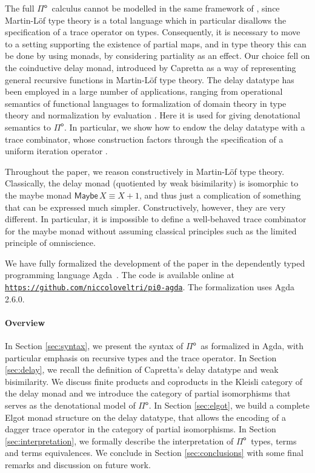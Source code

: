 \documentclass[runningheads,a4paper]{llncs}
\newcommand{\Pio}{\ensuremath{\mathsf{\Pi}^{\mathsf{o}}}}
\newcommand{\Maybe}{\mathsf{Maybe}}
\begin{document}
The full \Pio\ calculus cannot be modelled in the same framework of
\cite{CaretteS16}, since Martin-L\"of type theory is a total language
which in particular disallows the specification of a trace
operator on types. Consequently, it is necessary to move to a setting
supporting the existence of partial maps, and in type theory this can
be done by using monads, by considering partiality as an effect. Our
choice fell on the coinductive delay monad, introduced by Capretta
\cite{Capretta05} as a way of representing general recursive functions
in Martin-L\"of type theory. The delay datatype has been employed in a
large number of applications, ranging from operational semantics of
functional languages \cite{Danielsson12} to formalization of domain
theory in type theory \cite{BentonKV09} and normalization by
evaluation \cite{AbelC14}. Here it is used for giving denotational
semantics to \Pio. In particular, we show how to endow the delay
datatype with a trace combinator, whose construction factors
through the specification of a uniform iteration operator
\cite{GoncharovSRJ18,GoncharovMR16}. 

Throughout the paper, we reason constructively in Martin-L\"of type
theory. Classically, the delay monad (quotiented by
weak bisimilarity)
is isomorphic to the maybe monad
$\Maybe\,X \equiv X + 1$,
and thus just a complication of something that can be expressed much
simpler. Constructively, however, they are very different. In particular,
it is impossible to define a well-behaved trace combinator for the
maybe monad without assuming classical principles such as the limited
principle of omniscience.


We have fully formalized the development of the paper in the
dependently typed programming language Agda~\cite{Agda}. The code is
available online at \\ \texttt{\url{https://github.com/niccoloveltri/pi0-agda}}. The
formalization uses Agda 2.6.0.

\paragraph{Overview}
In Section \ref{sec:syntax}, we present the syntax of \Pio\ as
formalized in Agda, with particular emphasis on recursive types and
the trace operator. In Section \ref{sec:delay}, we recall the
definition of Capretta's delay datatype and weak bisimilarity. We
discuss finite products and coproducts in the Kleisli category of the
delay monad and we introduce the category of partial isomorphisms that
serves as the denotational model of \Pio. In Section
\ref{sec:elgot}, we build a complete Elgot monad structure on the delay
datatype, that allows the encoding of a dagger trace operator in the
category of partial isomorphisms. In Section \ref{sec:interpretation},
we formally describe the interpretation of \Pio\ types, terms and
terms equivalences. We conclude in Section \ref{sec:conclusions} with
some final remarks and discussion on future work.
\end{document}
